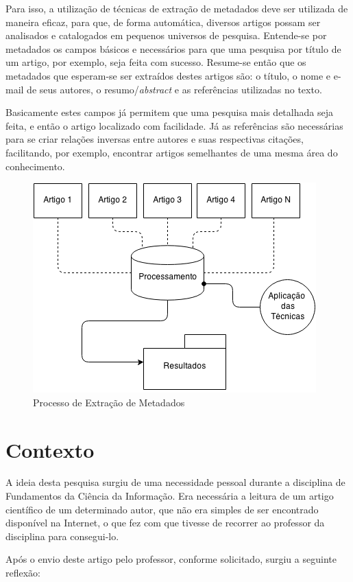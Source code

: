 Para isso, a utilização de técnicas de extração de metadados deve ser utilizada de maneira eficaz, para que, de forma automática, diversos artigos possam ser analisados e catalogados em pequenos universos de pesquisa. Entende-se por metadados os campos básicos e necessários para que uma pesquisa por título de um artigo, por exemplo, seja feita com sucesso. Resume-se então que os metadados que esperam-se ser extraídos destes artigos são: o título, o nome e e-mail de seus autores, o resumo/\textit{abstract} e as referências utilizadas no texto.

Basicamente estes campos já permitem que uma pesquisa mais detalhada seja feita, e então o artigo localizado com facilidade. Já as referências são necessárias para se criar relações inversas entre autores e suas respectivas citações, facilitando, por exemplo, encontrar artigos semelhantes de uma mesma área do conhecimento.

\begin{figure}
	\centering
	\caption{Processo de Extração de Metadados}
	\label{fig:introduction}
	\includegraphics[width=0.7\linewidth]{./assets/images/introduction}
\end{figure}

\section{Contexto}
\label{sec:context}

A ideia desta pesquisa surgiu de uma necessidade pessoal durante a disciplina de Fundamentos da Ciência da Informação. Era necessária a leitura de um artigo científico de um determinado autor, que não era simples de ser encontrado disponível na Internet, o que fez com que tivesse de recorrer ao professor da disciplina para consegui-lo.

Após o envio deste artigo pelo professor, conforme solicitado, surgiu a seguinte reflexão:

